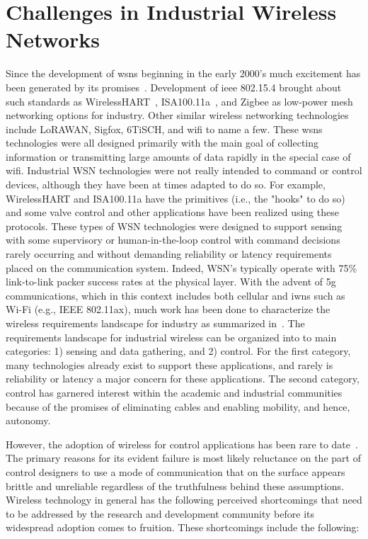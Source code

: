 \section{Challenges in Industrial Wireless Networks}
Since the development of \glspl{wsn} beginning in the early 2000's much excitement has been generated by its promises~\cite{OnWorld2014}.   Development of \gls{ieee} 802.15.4 brought about such standards as WirelessHART~\cite{Song2008}, ISA100.11a~\cite{ISA100.11a}, and Zigbee as low-power mesh networking options for industry.  Other similar wireless networking technologies include LoRAWAN, Sigfox, 6TiSCH, and \gls{wifi} to name a few.  These \glspl{wsn} technologies were all designed primarily with the main goal of collecting information or transmitting large amounts of data rapidly in the special case of \gls{wifi}.  Industrial WSN technologies were not really intended to command or control devices, although they have been at times adapted to do so.  For example, WirelessHART and ISA100.11a have the primitives (i.e., the "hooks" to do so) and some valve control and other applications have been realized using these protocols. These types of WSN technologies were designed to support sensing with some supervisory or human-in-the-loop control with command decisions rarely occurring and without demanding reliability or latency requirements placed on the communication system.  Indeed, WSN's typically operate with 75\% link-to-link packer success rates at the physical layer.  With the advent of \Gls{5g} communications, which in this context includes both cellular and \glspl{iwn} such as Wi-Fi (e.g., IEEE 802.11ax), much work has been done to characterize the wireless requirements landscape for industry as summarized in~\cite{Montgomery2019}.  The requirements landscape for industrial wireless can be organized into to main categories: 1) sensing and data gathering, and 2) control.  For the first category, many technologies already exist to support these applications, and rarely is reliability or latency a major concern for these applications.  The second category, control has garnered interest within the academic and industrial communities because of the promises of eliminating cables and enabling mobility, and hence, autonomy.  

However, the adoption of wireless for control applications has been rare to date~\cite{Martinez2019}.  The primary reasons for its evident failure is most likely reluctance on the part of control designers to use a mode of communication that on the surface appears brittle and unreliable regardless of the truthfulness behind these assumptions.  Wireless technology in general has the following perceived shortcomings that need to be addressed by the research and development community before its widespread adoption comes to fruition.  These shortcomings include the following:

